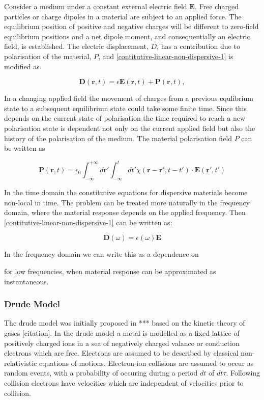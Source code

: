 Consider a medium under a constant external electric field $\mathbf{E}$. Free charged particles or charge dipoles in a material are subject to an applied force. The equilibrium position of positive and negative charges will be different to zero-field equilibrium positions and a net dipole moment, and consequentially an electric field, is established. The electric displacement, $D$, has a contribution due to polarisation of the material, $P$, and \eqref{contitutive-linear-non-dispersive-1} is modified as

$$
\mathbf{D}(\mathbf{r},t) = \epsilon \mathbf{E}(\mathbf{r},t) + \mathbf{P}(\mathbf{r},t) ,
$$

In a changing applied field the movement of charges from a previous equlibrium state to a subsequent equilibrium state could take some finite time. Since this depends on the current state of polarisation the time required to reach a new polarisation state is dependent not only on the current applied field but also the history of the polarisation of the medium. The material polarisation field $P$ can be written as

\begin{equation}
\mathbf{P}(\mathbf{r},t) = \epsilon_0 \int_{-\infty}^{+\infty} d \mathbf{r}' \int_{-\infty}^{t} dt' \chi (\mathbf{r} - \mathbf{r}', t - t') \cdot \mathbf{E}(\mathbf{r}', t')
\label{dispersive-convolution-integral}
\end{equation}


In the time domain the constitutive equations for dispersive materials become non-local in time. The problem can be treated more naturally in the frequency domain, where the material response depends on the applied frequency. Then \eqref{contitutive-linear-non-dispersive-1} can be written as:

\begin{equation}
  \mathbf{D}(\omega) = \epsilon(\omega) \mathbf{E}
\end{equation}


In the frequency domain we can write this as a dependence on

 for low frequencies, when material response can be approximated as instantaneous. 

\subsubsection{Drude Model} 
 The drude model was initially proposed in *** based on the kinetic theory of gases [citation]. In the drude model a metal is modelled as a fixed lattice of positively charged ions in a sea of negatively charged valance or conduction electrons which are free. Electrons are assumed to be described by classical non-relativistic equations of motions. Electron-ion collisions are assumed to occur as random events, with a probability of occuring during a period $dt$ of $dt \tau$. Following collision electrons have velocities which are independent of velocities prior to collision.
 
